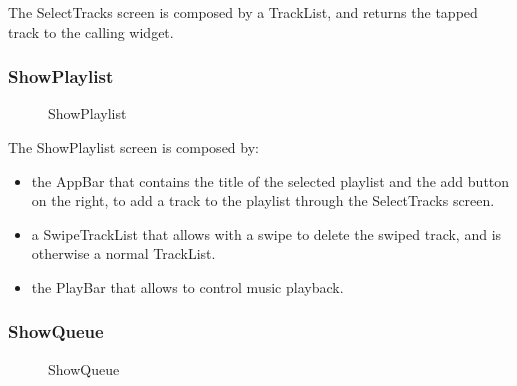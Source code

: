 \documentclass{article}
\begin{document}
The SelectTracks screen is composed by a TrackList, and returns the tapped track
to the calling widget.

\subsubsection{ShowPlaylist}

\begin{figure}[H]
	\noindent
	\caption{ShowPlaylist}
\end{figure}

The ShowPlaylist screen is composed by:
\begin{itemize}
    \item the AppBar that contains the title of the selected playlist and the
        add button on the right, to add a track to the playlist through the
        SelectTracks screen.
    \item a SwipeTrackList that allows with a swipe to delete the swiped track,
        and is otherwise a normal TrackList.
    \item the PlayBar that allows to control music playback.
\end{itemize}

\subsubsection{ShowQueue}

\begin{figure}[H]
	\noindent
	\caption{ShowQueue}
\end{figure}
\end{document}
